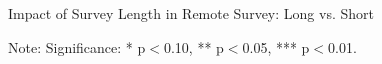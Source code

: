 \documentclass[11pt,harvard]{article}
\begin{document}
\begin{table}[htbp]
	\centering
	\begin{adjustbox}{max width=\textwidth}
		\begin{threeparttable}
			\caption{Impact of Survey Length in Remote Survey: Long vs. Short}
			\scriptsize
			 
			\label{tab:Myanmar_Outcome_RM_Length_Balance}
			\begin{tablenotes}
				\item Note: Significance: * p$<$0.10, ** p$<$0.05, *** p$<$0.01. 
			\end{tablenotes}
		\end{threeparttable}
	\end{adjustbox}
\end{table}

	\pagebreak
	
\end{document}
